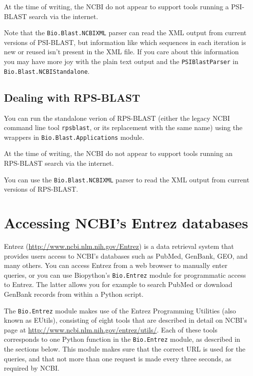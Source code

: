 \documentclass{report}
\begin{document}
At the time of writing, the NCBI do not appear to support tools running a
PSI-BLAST search via the internet.

Note that the \verb|Bio.Blast.NCBIXML| parser can read the XML output from
current versions of PSI-BLAST, but information like which sequences in each
iteration is new or reused isn't present in the XML file.
If you care about this information you may have more joy with the plain text
output and the \verb|PSIBlastParser| in \verb|Bio.Blast.NCBIStandalone|.

\section{Dealing with RPS-BLAST}

You can run the standalone verion of RPS-BLAST (either the legacy NCBI
command line tool \verb|rpsblast|, or its replacement with the same name)
using the wrappers in \verb|Bio.Blast.Applications| module.

At the time of writing, the NCBI do not appear to support tools running an
RPS-BLAST search via the internet.

You can use the \verb|Bio.Blast.NCBIXML| parser to read the XML output from
current versions of RPS-BLAST.

\chapter{Accessing NCBI's Entrez databases}
\label{chapter:entrez}

Entrez (\url{http://www.ncbi.nlm.nih.gov/Entrez}) is a data retrieval system that provides users access to NCBI's databases such as PubMed, GenBank, GEO, and many others. You can access Entrez from a web browser to manually enter queries, or you can use Biopython's \verb+Bio.Entrez+ module for programmatic access to Entrez. The latter allows you for example to search PubMed or download GenBank records from within a Python script.

The \verb+Bio.Entrez+ module makes use of the Entrez Programming Utilities (also known as EUtils), consisting of eight tools that are described in detail on NCBI's page at \url{http://www.ncbi.nlm.nih.gov/entrez/utils/}.
Each of these tools corresponds to one Python function in the \verb+Bio.Entrez+ module, as described in the sections below. This module makes sure that the correct URL is used for the queries, and that not more than one request is made every three seconds, as required by NCBI.
\end{document}
